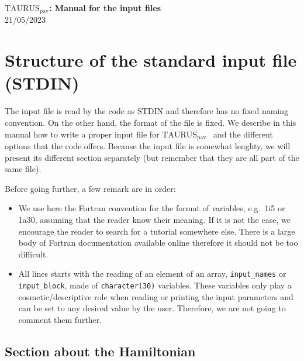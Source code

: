\documentclass[a4paper,11pt]{article}
\newcommand{\TAURUSpav}{$\text{TAURUS}_{\text{pav}}$}
\newcommand{\ttt}[1]{\texttt{#1}}
\begin{document}
%
% 
\begin{center}
 {\LARGE \textbf{\TAURUSpav: Manual for the input files}} \\
 {\large 21/05/2023}
\end{center}

%
% 
\section{Structure of the standard input file (STDIN)}

The input file is read by the code as STDIN and therefore has no fixed naming convention. 
On the other hand, the format of the file is fixed. We describe in this manual how to write a proper input file for \TAURUSpav~
and the different options that the code offers.
Because the input file is somewhat lenghty, we will present its different section separately (but remember that they
are all part of the same file).
 
\noindent Before going further, a few remark are in order:
\begin{itemize}
  \item We use here the Fortran convention for the format of variables, e.g.\ 1i5 or 1a30, assuming that the reader
  know their meaning. If it is not the case, we encourage the reader to search for a tutorial somewhere else.
  There is a large body of Fortran documentation available online therefore it should not be too difficult.

  \item All lines starts with the reading of an element of an array, \ttt{input\_names} or \ttt{input\_block},
  made of \ttt{character(30)} variables. 
  These variables only play a cosmetic/descriptive role when reading or printing the input parameters and can be
  set to any desired value by the user. Therefore, we are not going to comment them further.
\end{itemize}

%
%
\subsection{Section about the Hamiltonian}
\end{document}
